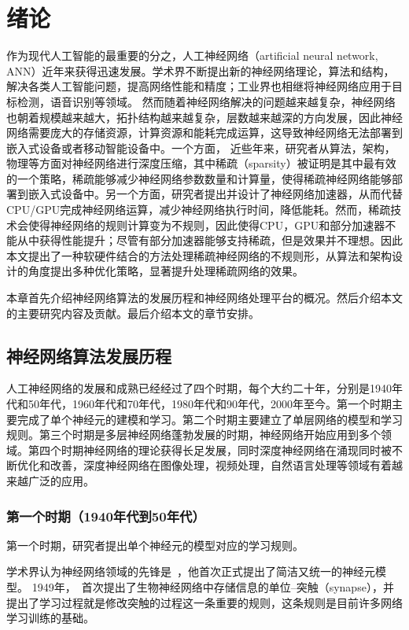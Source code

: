 \chapter{绪论}

作为现代人工智能的最重要的分之，人工神经网络（artificial neural network, ANN）近年来获得迅速发展。学术界不断提出新的神经网络理论，算法和结构，解决各类人工智能问题，提高网络性能和精度；工业界也相继将神经网络应用于目标检测，语音识别等领域。
然而随着神经网络解决的问题越来越复杂，神经网络也朝着规模越来越大，拓扑结构越来越复杂，层数越来越深的方向发展，因此神经网络需要庞大的存储资源，计算资源和能耗完成运算，这导致神经网络无法部署到嵌入式设备或者移动智能设备中。一个方面， 近些年来，研究者从算法，架构，物理等方面对神经网络进行深度压缩，其中稀疏（sparsity）被证明是其中最有效的一个策略，稀疏能够减少神经网络参数数量和计算量，使得稀疏神经网络能够部署到嵌入式设备中。另一个方面，研究者提出并设计了神经网络加速器，从而代替CPU/GPU完成神经网络运算，减少神经网络执行时间，降低能耗。然而，稀疏技术会使得神经网络的规则计算变为不规则，因此使得CPU，GPU和部分加速器不能从中获得性能提升；尽管有部分加速器能够支持稀疏，但是效果并不理想。因此本文提出了一种软硬件结合的方法处理稀疏神经网络的不规则形，从算法和架构设计的角度提出多种优化策略，显著提升处理稀疏网络的效果。

本章首先介绍神经网络算法的发展历程和神经网络处理平台的概况。然后介绍本文的主要研究内容及贡献。最后介绍本文的章节安排。

\section{神经网络算法发展历程}
人工神经网络的发展和成熟已经经过了四个时期，每个大约二十年，分别是1940年代和50年代，1960年代和70年代，1980年代和90年代，2000年至今。第一个时期主要完成了单个神经元的建模和学习。第二个时期主要建立了单层网络的模型和学习规则。第三个时期是多层神经网络蓬勃发展的时期，神经网络开始应用到多个领域。第四个时期神经网络的理论获得长足发展，同时深度神经网络在涌现同时被不断优化和改善，深度神经网络在图像处理，视频处理，自然语言处理等领域有着越来越广泛的应用。


\subsection{第一个时期（1940年代到50年代）}
第一个时期，研究者提出单个神经元的模型对应的学习规则。

学术界认为神经网络领域的先锋是~\citet{mcculloch1943logical}，他首次正式提出了简洁又统一的神经元模型。
1949年，~\citet{hebb1963organizations, gerstner2002mathematical}首次提出了生物神经网络中存储信息的单位--突触（synapse），并提出了学习过程就是修改突触的过程这一条重要的规则，这条规则是目前许多网络学习训练的基础。

